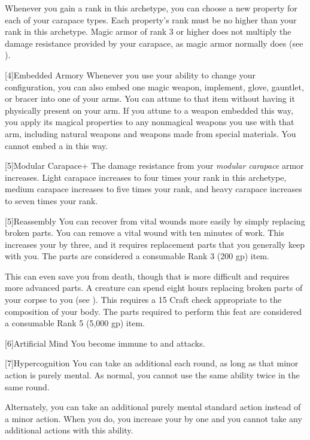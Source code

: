Whenever you gain a rank in this archetype, you can choose a new property for each of your carapace types.
Each property's rank must be no higher than your rank in this archetype.
Magic armor of rank 3 or higher does not multiply the damage resistance provided by your carapace, as magic armor normally does (see ).

[4]{Embedded Armory} Whenever you use your  ability to change your configuration, you can also embed one magic weapon, implement, glove, gauntlet, or bracer into one of your arms.
You can attune to that item without having it physically present on your arm.
If you attune to a weapon embedded this way, you apply its magical properties to any nonmagical weapons you use with that arm, including natural weapons and weapons made from special materials.
You cannot embed a  in this way.

[5]{Modular Carapace+} The damage resistance from your \textit{modular carapace} armor increases.
Light carapace increases to four times your rank in this archetype, medium carapace increases to five times your rank, and heavy carapace increases to seven times your rank.

[5]{Reassembly} You can recover from vital wounds more easily by simply replacing broken parts.
You can remove a vital wound with ten minutes of work.
This increases your  by three, and it requires replacement parts that you generally keep with you.
The parts are considered a consumable Rank 3 (200 gp) item.

This can even save you from death, though that is more difficult and requires more advanced parts.
A creature can spend eight hours replacing broken parts of your corpse to  you (see ).
This requires a  15 Craft check appropriate to the composition of your body.
The parts required to perform this feat are considered a consumable Rank 5 (5,000 gp) item.

[6]{Artificial Mind} You become immune to  and  attacks.

[7]{Hypercognition} You can take an additional  each round, as long as that minor action is purely mental.
As normal, you cannot use the same ability twice in the same round.

Alternately, you can take an additional purely mental standard action instead of a minor action.
When you do, you increase your  by one and you  cannot take any additional actions with this ability.

